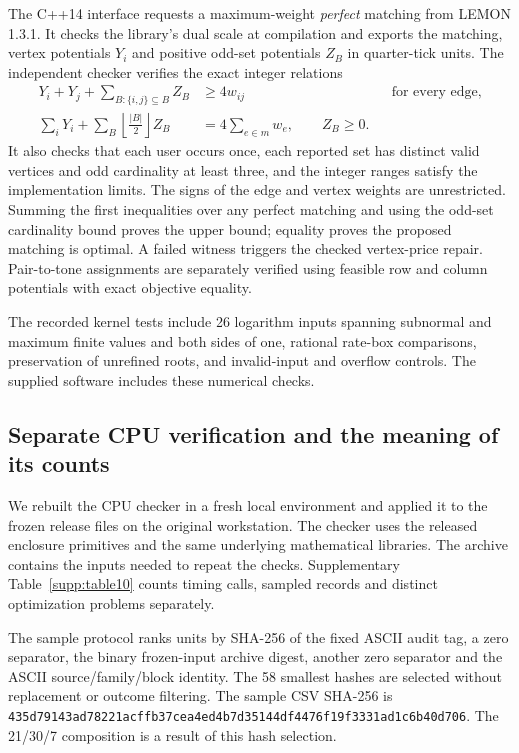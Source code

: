The C++14 interface requests a maximum-weight \emph{perfect} matching from LEMON 1.3.1. It checks the library's dual scale at compilation and exports the matching, vertex potentials \(Y_i\) and positive odd-set potentials \(Z_B\) in quarter-tick units. The independent checker verifies the exact integer relations
\begin{equation}
 \begin{aligned}
 Y_i+Y_j+\sum_{B:\{i,j\}\subseteq B}Z_B&\geq4w_{ij}
                   &&\text{for every edge},\\
 \sum_iY_i+\sum_B\left\lfloor\frac{|B|}{2}\right\rfloor Z_B
                &=4\sum_{e\in m}w_e,\qquad Z_B\geq0 .
 \end{aligned}
 \label{supp:eq:quartertick}
\end{equation}
It also checks that each user occurs once, each reported set has distinct valid vertices and odd cardinality at least three, and the integer ranges satisfy the implementation limits. The signs of the edge and vertex weights are unrestricted. Summing the first inequalities over any perfect matching and using the odd-set cardinality bound proves the upper bound; equality proves the proposed matching is optimal. A failed witness triggers the checked vertex-price repair. Pair-to-tone assignments are separately verified using feasible row and column potentials with exact objective equality.

The recorded kernel tests include 26 logarithm inputs spanning subnormal and maximum finite values and both sides of one, rational rate-box comparisons, preservation of unrefined roots, and invalid-input and overflow controls. The supplied software includes these numerical checks.

\clearpage
\subsection*{Separate CPU verification and the meaning of its counts}
We rebuilt the CPU checker in a fresh local environment and applied it to the frozen release files on the original workstation. The checker uses the released enclosure primitives and the same underlying mathematical libraries. The archive contains the inputs needed to repeat the checks. Supplementary Table~\ref{supp:table10} counts timing calls, sampled records and distinct optimization problems separately.



The sample protocol ranks units by SHA-256 of the fixed ASCII audit tag,
a zero separator, the binary frozen-input archive digest, another zero separator and
the ASCII source/family/block identity. The 58 smallest hashes are selected
without replacement or outcome filtering. The sample CSV SHA-256 is
\texttt{435d79143ad78221acffb37cea4ed4b7d}\allowbreak\texttt{35144df4476f19f3331ad1c6b40d706}.
The 21/30/7 composition is a result of this hash selection.

